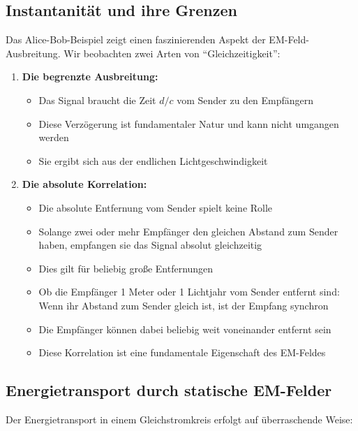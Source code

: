 \documentclass[12pt,a4paper]{article}
\begin{document}
\subsection{Instantanität und ihre Grenzen}
Das Alice-Bob-Beispiel zeigt einen faszinierenden Aspekt der EM-Feld-Ausbreitung. Wir beobachten zwei Arten von ``Gleichzeitigkeit'':

\begin{enumerate}
    \item \textbf{Die begrenzte Ausbreitung:}
    \begin{itemize}
        \item Das Signal braucht die Zeit $d/c$ vom Sender zu den Empfängern
        \item Diese Verzögerung ist fundamentaler Natur und kann nicht umgangen werden
        \item Sie ergibt sich aus der endlichen Lichtgeschwindigkeit
    \end{itemize}

    \item \textbf{Die absolute Korrelation:}
    \begin{itemize}
        \item Die absolute Entfernung vom Sender spielt keine Rolle
        \item Solange zwei oder mehr Empfänger den gleichen Abstand zum Sender haben, empfangen sie das Signal absolut gleichzeitig
        \item Dies gilt für beliebig große Entfernungen
        \item Ob die Empfänger 1 Meter oder 1 Lichtjahr vom Sender entfernt sind: Wenn ihr Abstand zum Sender gleich ist, ist der Empfang synchron
        \item Die Empfänger können dabei beliebig weit voneinander entfernt sein
        \item Diese Korrelation ist eine fundamentale Eigenschaft des EM-Feldes
    \end{itemize}
\end{enumerate}

\subsection{Energietransport durch statische EM-Felder}
Der Energietransport in einem Gleichstromkreis erfolgt auf überraschende Weise:
\end{document}
